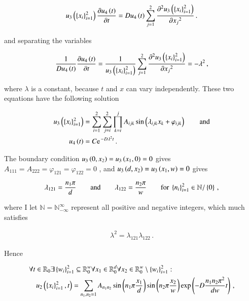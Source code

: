 \documentclass[11pt,english,a4paper]{article}
\begin{document}
\begin{flushleft}
\begin{align*}
u_3\left({\left\lbrace{x_i}\right\rbrace_{i=1}^2}\right)\frac{\partial u_4\left({t}\right)}{\partial t} = Du_4\left({t}\right)\sum_{j=1}^2\frac{\partial^2 u_3\left({\left\lbrace{x_i}\right\rbrace_{i=1}^2}\right)}{\partial {x_j}^2} \,.
\end{align*}

and separating the variables

\begin{align*}
\frac{1}{Du_4\left({t}\right)} \frac{\partial u_4\left({t}\right)}{\partial t} = \frac{1}{u_3\left({\left\lbrace{x_i}\right\rbrace_{i=1}^2}\right)}\sum_{j=1}^2\frac{\partial^2 u_3\left({\left\lbrace{x_i}\right\rbrace_{i=1}^2}\right)}{\partial {x_j}^2} = -\lambda^2 \,,
\end{align*}

where $\lambda$ is a constant, because $t$ and $x$ can vary independently. These two equations have the following solution

\begin{align*}
u_3\p{\kr{x_i}_{i=1}^2} &= \sum_{i=1}^2\sum_{j=i}^2 \prod_{k=i}^j A_{ijk} \sin\p{\lambda_{ijk} x_k + \varphi_{ijk}} \qquad \text{and}
\\
u_4\p{t} &= C\e^{-D\lambda^2 t}\,.
\end{align*}

The boundary condition $u_3\left({0,x_2}\right)=u_3\left({x_1,0}\right)=0$ gives $A_{111} = A_{222} = \varphi_{121}=\varphi_{122}=0$ , and $u_3\left({d,x_2}\right)=u_3\left({x_1,w}\right)=0$ gives 

\begin{align*}
\lambda_{121} = \frac{n_1\pi}{d}  \qquad \text{and} \qquad \lambda_{122} = \frac{n_2\pi}{w} \qquad \text{for } \left\lbrace{n_i}\right\rbrace_{i=1}^2 \in \mathbb{N}/\left\lbrace{0}\right\rbrace\,,
\end{align*}

where I let $\mathbb{N}=\mathbb{N}_{-\infty}^{\infty}$ represent all positive and negative integers, which much satisfies

\begin{align*}
\lambda^2 = \lambda_{121}\lambda_{122}\,.
\end{align*}

Hence

\begin{align}
&\forall t\in \mathbb{R}_0\exists\left\lbrace{w_i}\right\rbrace_{i=1}^2\subseteq \mathbb{R}_0^w \forall x_1\in \mathbb{R}_{0}^d \forall x_2\in\mathbb{R}_0^w \setminus \left\lbrace{w_i}\right\rbrace_{i=1}^2 : 
\nonumber\\
&\quad u_2\left({\left\lbrace{x_i}\right\rbrace_{i=1}^2,t}\right) = \sum_{n_1,n_2=1} A_{n_1 n_2} \sin\left({n_1\pi \frac{x_1}{d}}\right) \sin\left({n_2\pi \frac{x_2}{w}}\right) \exp\left({-D\frac{n_1 n_2 \pi^2}{dw} t}\right)\,,
\label{eq_17}
\end{align}


\end{flushleft}
\end{document}

